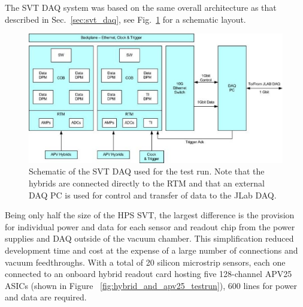 
The SVT DAQ system was based on the same overall architecture as that 
described in Sec.~\ref{sec:svt_daq}, see Fig.~\ref{fig:svtdaq} for a schematic layout. 
 \begin{figure}[t]
\includegraphics[scale=0.9]{test2012/daq/svt_daq_diagram.jpg}
\caption{\small{Schematic of the SVT DAQ used for the test run. Note that the hybrids are connected directly 
to the RTM and that an external DAQ PC is used for control and transfer of data to the JLab DAQ.}}
\label{fig:svtdaq}
\end{figure}
Being only half the size of the HPS SVT, the largest difference is the provision for
individual power and data for each sensor and readout chip from the power supplies and DAQ outside of the vacuum chamber.
This simplification reduced development time and cost at the expense of a large number of connections and vacuum feedthroughs.
With a total of 20 silicon microstrip sensors, each one connected to an onboard hybrid readout 
card hosting five 128-channel APV25 ASICs (shown in Figure ~\ref{fig:hybrid_and_apv25_testrun}), 600 lines for power and data are required.
